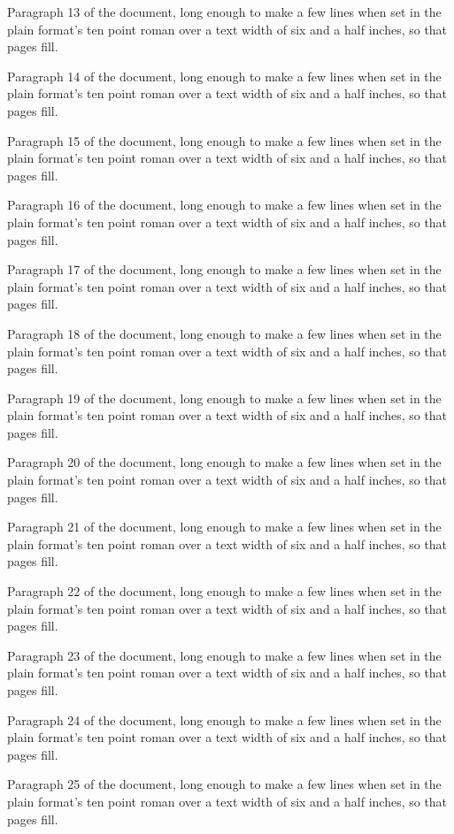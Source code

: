 Paragraph 13 of the document, long enough to make a few lines when set in the plain format's ten point roman over a text width of six and a half inches, so that pages fill.

Paragraph 14 of the document, long enough to make a few lines when set in the plain format's ten point roman over a text width of six and a half inches, so that pages fill.

Paragraph 15 of the document, long enough to make a few lines when set in the plain format's ten point roman over a text width of six and a half inches, so that pages fill.

Paragraph 16 of the document, long enough to make a few lines when set in the plain format's ten point roman over a text width of six and a half inches, so that pages fill.

Paragraph 17 of the document, long enough to make a few lines when set in the plain format's ten point roman over a text width of six and a half inches, so that pages fill.

Paragraph 18 of the document, long enough to make a few lines when set in the plain format's ten point roman over a text width of six and a half inches, so that pages fill.

Paragraph 19 of the document, long enough to make a few lines when set in the plain format's ten point roman over a text width of six and a half inches, so that pages fill.

Paragraph 20 of the document, long enough to make a few lines when set in the plain format's ten point roman over a text width of six and a half inches, so that pages fill.

Paragraph 21 of the document, long enough to make a few lines when set in the plain format's ten point roman over a text width of six and a half inches, so that pages fill.

Paragraph 22 of the document, long enough to make a few lines when set in the plain format's ten point roman over a text width of six and a half inches, so that pages fill.

Paragraph 23 of the document, long enough to make a few lines when set in the plain format's ten point roman over a text width of six and a half inches, so that pages fill.

Paragraph 24 of the document, long enough to make a few lines when set in the plain format's ten point roman over a text width of six and a half inches, so that pages fill.

Paragraph 25 of the document, long enough to make a few lines when set in the plain format's ten point roman over a text width of six and a half inches, so that pages fill.

